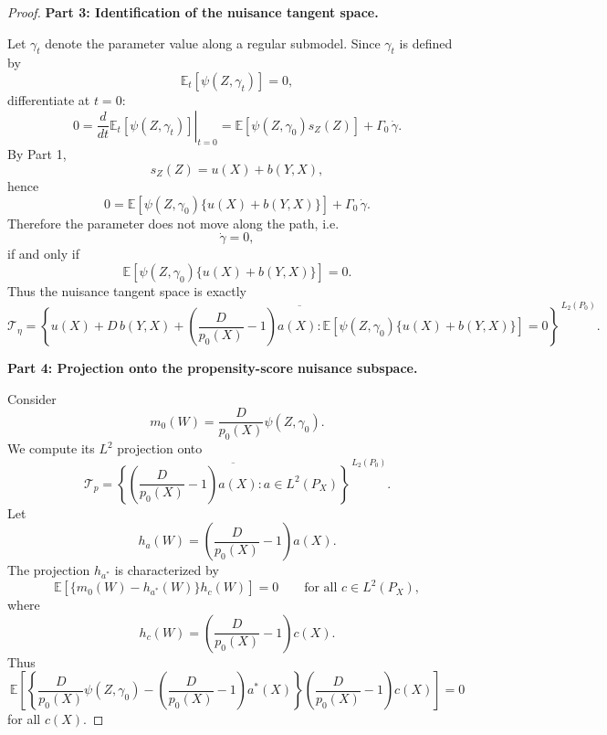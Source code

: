 \documentclass[12pt]{article}
\renewcommand{\(}{\left(}%
\renewcommand{\)}{\right)}%
\renewcommand{\[}{\left[}%
\renewcommand{\]}{\right]}%
\newtheorem{proof}{Proof.}}
\begin{document}
\begin{proof}
\medskip
\noindent
\textbf{Part 3: Identification of the nuisance tangent space.}

Let $\gamma_t$ denote the parameter value along a regular submodel. Since $\gamma_t$ is defined by
\begin{equation*}
\mathbb{E}_t[\psi(Z,\gamma_t)]=0,
\end{equation*}
differentiate at $t=0$:
\begin{equation*}
0
=
\left.\frac{d}{dt}\mathbb{E}_t[\psi(Z,\gamma_t)]\right|_{t=0}
=
\mathbb{E}\!\left[\psi(Z,\gamma_0)s_Z(Z)\right]
+
\Gamma_0\,\dot\gamma.
\end{equation*}
By Part 1,
\begin{equation*}
s_Z(Z)=u(X)+b(Y,X),
\end{equation*}
hence
\begin{equation*}
0
=
\mathbb{E}\!\left[\psi(Z,\gamma_0)\{u(X)+b(Y,X)\}\right]
+
\Gamma_0\,\dot\gamma.
\end{equation*}
Therefore the parameter does not move along the path, i.e.
\begin{equation*}
\dot\gamma=0,
\end{equation*}
if and only if
\begin{equation*}
\mathbb{E}\!\left[\psi(Z,\gamma_0)\{u(X)+b(Y,X)\}\right]=0.
\end{equation*}
Thus the nuisance tangent space is exactly
\begin{equation*}
\mathcal{T}_{\eta}
=
\overline{
\left\{
u(X)+D\,b(Y,X)+\left(\frac{D}{p_0(X)}-1\right)a(X):
\mathbb{E}\!\left[\psi(Z,\gamma_0)\{u(X)+b(Y,X)\}\right]=0
\right\}
}^{\,L_2(P_0)}.
\end{equation*}

\medskip
\noindent
\textbf{Part 4: Projection onto the propensity-score nuisance subspace.}

Consider
\begin{equation*}
m_0(W)=\frac{D}{p_0(X)}\psi(Z,\gamma_0).
\end{equation*}
We compute its $L^2$ projection onto
\begin{equation*}
\mathcal{T}_{p}
=
\overline{
\left\{
\left(\frac{D}{p_0(X)}-1\right)a(X): a\in L^2(P_X)
\right\}
}^{\,L_2(P_0)}.
\end{equation*}
Let
\begin{equation*}
h_a(W)=\left(\frac{D}{p_0(X)}-1\right)a(X).
\end{equation*}
The projection $h_{a^*}$ is characterized by
\begin{equation*}
\mathbb{E}\!\left[\{m_0(W)-h_{a^*}(W)\}h_c(W)\right]=0
\qquad
\text{for all } c\in L^2(P_X),
\end{equation*}
where
\begin{equation*}
h_c(W)=\left(\frac{D}{p_0(X)}-1\right)c(X).
\end{equation*}
Thus
\begin{equation*}
\mathbb{E}\!\left[
\left\{
\frac{D}{p_0(X)}\psi(Z,\gamma_0)
-
\left(\frac{D}{p_0(X)}-1\right)a^*(X)
\right\}
\left(\frac{D}{p_0(X)}-1\right)c(X)
\right]=0
\end{equation*}
for all $c(X)$.


\end{proof}
\end{document}
